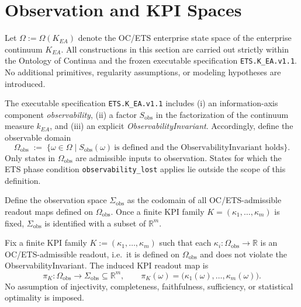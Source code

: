 ﻿\section{Observation and KPI Spaces}

\begin{definition}
Let \(\Omega := \Omega(K_{EA})\) denote the OC/ETS enterprise state space of the
enterprise continuum \(K_{EA}\).
All constructions in this section are carried out strictly within the Ontology
of Continua and the frozen executable specification
\texttt{ETS.K\_EA.v1.1}.
No additional primitives, regularity assumptions, or modeling hypotheses are
introduced.
\end{definition}

\begin{definition}
The executable specification \texttt{ETS.K\_EA.v1.1} includes
(i) an information-axis component \emph{observability},
(ii) a factor \(S_{\mathrm{obs}}\) in the factorization of the continuum measure
\(k_{EA}\), and
(iii) an explicit \emph{ObservabilityInvariant}.
Accordingly, define the observable domain
\[
\Omega_{\mathrm{obs}}
\;:=\;
\bigl\{
\omega \in \Omega
\;\big|\;
S_{\mathrm{obs}}(\omega)\ \text{is defined and the ObservabilityInvariant holds}
\bigr\}.
\]
Only states in \(\Omega_{\mathrm{obs}}\) are admissible inputs to observation.
States for which the ETS phase condition \texttt{observability\_lost} applies lie
outside the scope of this definition.
\end{definition}

\begin{definition}
Define the observation space \(\Sigma_{\mathrm{obs}}\) as the codomain of all
OC/ETS-admissible readout maps defined on \(\Omega_{\mathrm{obs}}\).
Once a finite KPI family \(K=(\kappa_1,\ldots,\kappa_m)\) is fixed,
\(\Sigma_{\mathrm{obs}}\) is identified with a subset of \(\mathbb{R}^m\).
\end{definition}

\begin{definition}\label{def:kpi-family}
Fix a finite KPI family
\(K := (\kappa_1,\ldots,\kappa_m)\) such that each
\(\kappa_i:\Omega_{\mathrm{obs}}\to\mathbb{R}\) is an OC/ETS-admissible readout,
i.e.\ it is defined on \(\Omega_{\mathrm{obs}}\) and does not violate the
ObservabilityInvariant.
The induced KPI readout map is
\[
\pi_{K}:\Omega_{\mathrm{obs}}\to\Sigma_{\mathrm{obs}}\subseteq\mathbb{R}^m,
\qquad
\pi_{K}(\omega)
=
\bigl(\kappa_1(\omega),\ldots,\kappa_m(\omega)\bigr).
\]
No assumption of injectivity, completeness, faithfulness, sufficiency, or
statistical optimality is imposed.
\end{definition}

